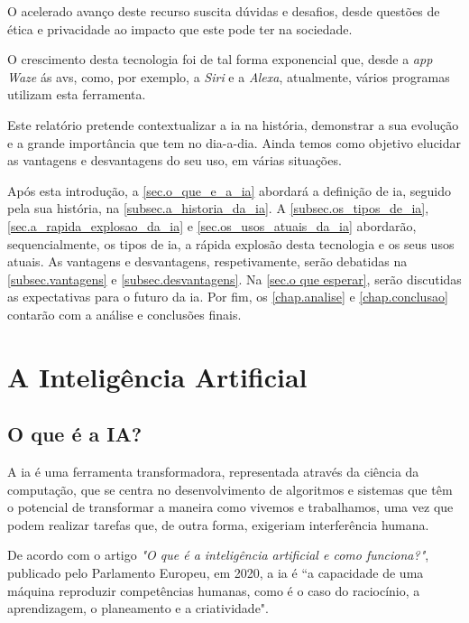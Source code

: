 \documentclass{report}
\begin{document}
	O acelerado avanço deste recurso suscita dúvidas e desafios, desde questões de ética e privacidade ao impacto que este pode ter na sociedade. 
		
	O crescimento desta tecnologia foi de tal forma exponencial que, desde a \textit{app Waze} ás \ac{avs}, como, por exemplo, a \textit{Siri} e a \textit{Alexa}, atualmente, vários programas utilizam esta ferramenta.
	
	Este relatório pretende contextualizar a \ac{ia} na história, demonstrar a sua evolução e a grande importância que tem no dia-a-dia. Ainda temos como objetivo elucidar as vantagens e desvantagens do seu uso, em várias situações.
	
	Após esta introdução, a \autoref{sec.o_que_e_a_ia} abordará a definição de \ac{ia}, seguido pela sua história, na \autoref{subsec.a_historia_da_ia}. A \autoref{subsec.os_tipos_de_ia}, \autoref{sec.a_rapida_explosao_da_ia} e \autoref{sec.os_usos_atuais_da_ia} abordarão, sequencialmente, os tipos de \ac{ia}, a rápida explosão desta tecnologia e os seus usos atuais. As vantagens e desvantagens, respetivamente, serão debatidas na \autoref{subsec.vantagens} e \autoref{subsec.desvantagens}. Na \autoref{sec.o que esperar}, serão discutidas as expectativas para o futuro da \ac{ia}. Por fim, os \autoref{chap.analise} e \autoref{chap.conclusao} contarão com a análise e conclusões finais.

\chapter{A Inteligência Artificial}
\label{chap.a_inteligencia_artificial}

\section{O que é a IA?}
\label{sec.o_que_e_a_ia}

	A \ac{ia} é uma ferramenta transformadora, representada através da ciência da computação, que se centra no desenvolvimento de algoritmos e sistemas que têm o potencial de transformar a maneira como vivemos e trabalhamos, uma vez que podem realizar tarefas que, de outra forma, exigeriam interferência humana.

	De acordo com o artigo \textit{"O que é a inteligência artificial e como funciona?"}, publicado pelo Parlamento Europeu, em 2020, a \ac{ia} é “a capacidade de uma máquina reproduzir competências humanas, como é o caso do raciocínio, a aprendizagem, o planeamento e a criatividade". \cite{artigo}
\end{document}
